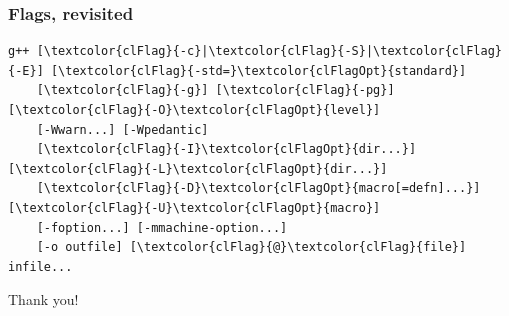\documentclass[aspectratio=169]{beamer}
\begin{document}
\begin{frame}[fragile]
\frametitle{Flags, revisited}

\centering
\begin{BVerbatim}[commandchars=\\\{\}]
g++ [\textcolor{clFlag}{-c}|\textcolor{clFlag}{-S}|\textcolor{clFlag}{-E}] [\textcolor{clFlag}{-std=}\textcolor{clFlagOpt}{standard}]
    [\textcolor{clFlag}{-g}] [\textcolor{clFlag}{-pg}] [\textcolor{clFlag}{-O}\textcolor{clFlagOpt}{level}]
    [-Wwarn...] [-Wpedantic]
    [\textcolor{clFlag}{-I}\textcolor{clFlagOpt}{dir...}] [\textcolor{clFlag}{-L}\textcolor{clFlagOpt}{dir...}]
    [\textcolor{clFlag}{-D}\textcolor{clFlagOpt}{macro[=defn]...}] [\textcolor{clFlag}{-U}\textcolor{clFlagOpt}{macro}]
    [-foption...] [-mmachine-option...]
    [-o outfile] [\textcolor{clFlag}{@}\textcolor{clFlag}{file}] infile...
\end{BVerbatim}

\vspace{4.5ex}
\begin{center}
{\huge Thank you!}
\end{center}
\end{frame}
\end{document}
